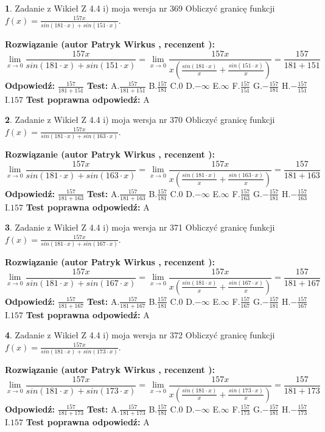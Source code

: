 \documentclass[12pt, a4paper]{article}
\theoremstyle{definition} %
\newtheorem{zad}{}
\newcommand{\zadStart}[1]{\begin{zad}#1\newline}
\newcommand{\zadStop}{\end{zad}}
\newcommand{\rozwStart}[2]{\noindent \textbf{Rozwiązanie (autor #1 , recenzent #2): }\newline}
\newcommand{\rozwStop}{\newline}
\newcommand{\odpStart}{\noindent \textbf{Odpowiedź:}\newline}
\newcommand{\odpStop}{\newline}
\newcommand{\testStart}{\noindent \textbf{Test:}\newline}
\newcommand{\testStop}{\newline}
\newcommand{\kluczStart}{\noindent \textbf{Test poprawna odpowiedź:}\newline}
\newcommand{\kluczStop}{\newline}
\begin{document}
\zadStart{Zadanie z Wikieł Z 4.4 i) moja wersja nr 369}
Obliczyć granicę funkcji $f(x)=\frac{157x}{sin(181\cdot x) +sin(151\cdot x)}$.
\zadStop
\rozwStart{Patryk Wirkus}{}
$$\lim\limits_{x\to 0}\frac{157x}{sin(181\cdot x) +sin(151\cdot x)}=\lim\limits_{x\to 0}\frac{157x}{x(\frac{sin(181\cdot x)}{x}+\frac{sin(151\cdot x)}{x})}=\frac{157}{181+151}$$
\rozwStop
\odpStart
$\frac{157}{181+151}$
\odpStop
\testStart
A.$\frac{157}{181+151}$
B.$\frac{157}{181}$
C.$0$
D.$-\infty$
E.$\infty$
F.$\frac{157}{151}$
G.$-\frac{157}{181}$
H.$-\frac{157}{151}$
I.$157$
\testStop
\kluczStart
A
\kluczStop



\zadStart{Zadanie z Wikieł Z 4.4 i) moja wersja nr 370}
Obliczyć granicę funkcji $f(x)=\frac{157x}{sin(181\cdot x) +sin(163\cdot x)}$.
\zadStop
\rozwStart{Patryk Wirkus}{}
$$\lim\limits_{x\to 0}\frac{157x}{sin(181\cdot x) +sin(163\cdot x)}=\lim\limits_{x\to 0}\frac{157x}{x(\frac{sin(181\cdot x)}{x}+\frac{sin(163\cdot x)}{x})}=\frac{157}{181+163}$$
\rozwStop
\odpStart
$\frac{157}{181+163}$
\odpStop
\testStart
A.$\frac{157}{181+163}$
B.$\frac{157}{181}$
C.$0$
D.$-\infty$
E.$\infty$
F.$\frac{157}{163}$
G.$-\frac{157}{181}$
H.$-\frac{157}{163}$
I.$157$
\testStop
\kluczStart
A
\kluczStop



\zadStart{Zadanie z Wikieł Z 4.4 i) moja wersja nr 371}
Obliczyć granicę funkcji $f(x)=\frac{157x}{sin(181\cdot x) +sin(167\cdot x)}$.
\zadStop
\rozwStart{Patryk Wirkus}{}
$$\lim\limits_{x\to 0}\frac{157x}{sin(181\cdot x) +sin(167\cdot x)}=\lim\limits_{x\to 0}\frac{157x}{x(\frac{sin(181\cdot x)}{x}+\frac{sin(167\cdot x)}{x})}=\frac{157}{181+167}$$
\rozwStop
\odpStart
$\frac{157}{181+167}$
\odpStop
\testStart
A.$\frac{157}{181+167}$
B.$\frac{157}{181}$
C.$0$
D.$-\infty$
E.$\infty$
F.$\frac{157}{167}$
G.$-\frac{157}{181}$
H.$-\frac{157}{167}$
I.$157$
\testStop
\kluczStart
A
\kluczStop



\zadStart{Zadanie z Wikieł Z 4.4 i) moja wersja nr 372}
Obliczyć granicę funkcji $f(x)=\frac{157x}{sin(181\cdot x) +sin(173\cdot x)}$.
\zadStop
\rozwStart{Patryk Wirkus}{}
$$\lim\limits_{x\to 0}\frac{157x}{sin(181\cdot x) +sin(173\cdot x)}=\lim\limits_{x\to 0}\frac{157x}{x(\frac{sin(181\cdot x)}{x}+\frac{sin(173\cdot x)}{x})}=\frac{157}{181+173}$$
\rozwStop
\odpStart
$\frac{157}{181+173}$
\odpStop
\testStart
A.$\frac{157}{181+173}$
B.$\frac{157}{181}$
C.$0$
D.$-\infty$
E.$\infty$
F.$\frac{157}{173}$
G.$-\frac{157}{181}$
H.$-\frac{157}{173}$
I.$157$
\testStop
\kluczStart
A
\kluczStop
\end{document}
